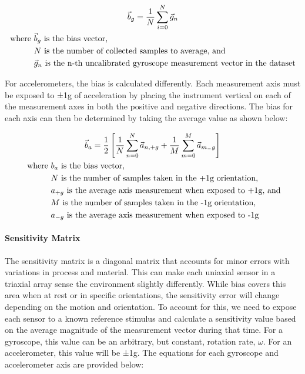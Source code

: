 \begin{gather}
    \vec{b}_g = \frac{1}{N} \sum_{i=0}^N{\vec{g}_n} \\
    \begin{aligned}
        \text{where } & \vec{b}_g \text{ is the bias vector,} \\
        & N \text{ is the number of collected samples to average, and} \\
        & \vec{g}_n \text{ is the n-th uncalibrated gyroscope measurement vector in the dataset}
    \end{aligned} \notag
\end{gather}

For accelerometers, the bias is calculated differently. Each measurement axis must be exposed to ±1g of acceleration by placing the instrument vertical on each of the measurement axes in both the positive and negative directions. The bias for each axis can then be determined by taking the average value as shown below:

\begin{gather}
    \vec{b}_a = \frac{1}{2} \left[ \frac{1}{N}\sum_{n=0}^N{\vec{a}_{n,+g}} + \frac{1}{M}\sum_{m=0}^M{\vec{a}_{m_-g}} \right] \\\
    \begin{aligned}
        \text{where } & b_a \text{ is the bias vector,} \\
        & N \text{ is the number of samples taken in the +1g orientation,} \\
        & a_{+g} \text{ is the average axis measurement when exposed to +1g, and}\\
        & M \text{ is the number of samples taken in the -1g orientation,} \\
        & a_{-g} \text{ is the average axis measurement when exposed to -1g}
    \end{aligned} \notag
\end{gather}

\paragraph*{Sensitivity Matrix} The sensitivity matrix is a diagonal matrix that accounts for minor errors with variations in process and material. 
This can make each uniaxial sensor in a triaxial array sense the environment slightly differently. 
While bias covers this area when at rest or in specific orientations, the sensitivity error will change depending on the motion and orientation. 
To account for this, we need to expose each sensor to a known reference stimulus and calculate a sensitivity value based on the average magnitude of the measurement vector during that time. 
For a gyroscope, this value can be an arbitrary, but constant, rotation rate, $\omega$. 
For an accelerometer, this value will be ±1g. The equations for each gyroscope and accelerometer axis are provided below:

